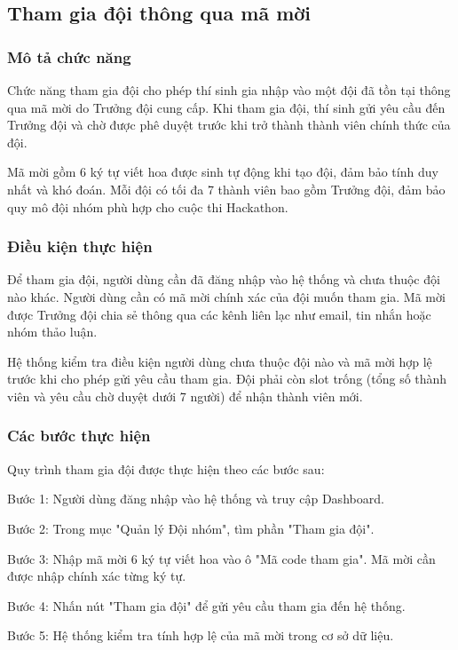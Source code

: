 \subsection{Tham gia đội thông qua mã mời}

\subsubsection{Mô tả chức năng}

Chức năng tham gia đội cho phép thí sinh gia nhập vào một đội đã tồn tại thông qua mã mời do Trưởng đội cung cấp. Khi tham gia đội, thí sinh gửi yêu cầu đến Trưởng đội và chờ được phê duyệt trước khi trở thành thành viên chính thức của đội.

Mã mời gồm 6 ký tự viết hoa được sinh tự động khi tạo đội, đảm bảo tính duy nhất và khó đoán. Mỗi đội có tối đa 7 thành viên bao gồm Trưởng đội, đảm bảo quy mô đội nhóm phù hợp cho cuộc thi Hackathon.

\subsubsection{Điều kiện thực hiện}

Để tham gia đội, người dùng cần đã đăng nhập vào hệ thống và chưa thuộc đội nào khác. Người dùng cần có mã mời chính xác của đội muốn tham gia. Mã mời được Trưởng đội chia sẻ thông qua các kênh liên lạc như email, tin nhắn hoặc nhóm thảo luận.

Hệ thống kiểm tra điều kiện người dùng chưa thuộc đội nào và mã mời hợp lệ trước khi cho phép gửi yêu cầu tham gia. Đội phải còn slot trống (tổng số thành viên và yêu cầu chờ duyệt dưới 7 người) để nhận thành viên mới.

\subsubsection{Các bước thực hiện}

Quy trình tham gia đội được thực hiện theo các bước sau:

Bước 1: Người dùng đăng nhập vào hệ thống và truy cập Dashboard.

Bước 2: Trong mục "Quản lý Đội nhóm", tìm phần "Tham gia đội".

Bước 3: Nhập mã mời 6 ký tự viết hoa vào ô "Mã code tham gia". Mã mời cần được nhập chính xác từng ký tự.

Bước 4: Nhấn nút "Tham gia đội" để gửi yêu cầu tham gia đến hệ thống.

Bước 5: Hệ thống kiểm tra tính hợp lệ của mã mời trong cơ sở dữ liệu.

